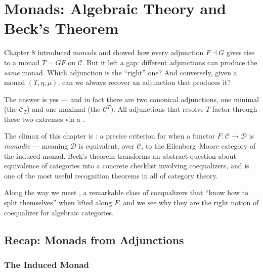 
\chapter{Monads: Algebraic Theory and Beck's Theorem}

\begin{overviewbox}
Chapter 8 introduced monads and showed how every adjunction $F \dashv G$
gives rise to a monad $T = GF$ on $\mathcal{C}$. But it left a gap:
different adjunctions can produce the \emph{same} monad. Which adjunction
is the ``right'' one? And conversely, given a monad $(T,\eta,\mu)$, can
we always recover an adjunction that produces it?

The answer is yes --- and in fact there are two canonical adjunctions, one
minimal (the  $\mathcal{C}_T$) and one maximal (the
 $\mathcal{C}^T$). All adjunctions that
resolve $T$ factor through these two extremes via a .

The climax of this chapter is : a precise
criterion for when a functor $F : \mathcal{C} \to \mathcal{D}$ is
\emph{monadic} --- meaning $\mathcal{D}$ is equivalent, over $\mathcal{C}$,
to the Eilenberg--Moore category of the induced monad. Beck's theorem
transforms an abstract question about equivalence of categories into a
concrete checklist involving coequalizers, and is one of the most useful
recognition theorems in all of category theory.

Along the way we meet , a remarkable class
of coequalizers that ``know how to split themselves'' when lifted along
$F$, and we see why they are the right notion of coequalizer for algebraic
categories.
\end{overviewbox}


\section{Recap: Monads from Adjunctions}
\label{sec:monads-from-adj}

\subsection{The Induced Monad}

